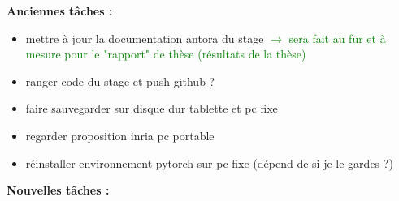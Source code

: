 \textbf{Anciennes tâches :}

\begin{itemize}[label=$\square$]
	\item[\wontfix] mettre à jour la documentation antora du stage \textcolor{green}{$\rightarrow$ sera fait au fur et à mesure pour le "rapport" de thèse (résultats de la thèse)}
	\item[\wontfix] ranger code du stage et push github ?
	\item faire sauvegarder sur disque dur tablette et pc fixe
	\item[\done] regarder proposition inria pc portable
	\item réinstaller environnement pytorch sur pc fixe (dépend de si je le gardes ?)
\end{itemize}

\textbf{Nouvelles tâches :}

